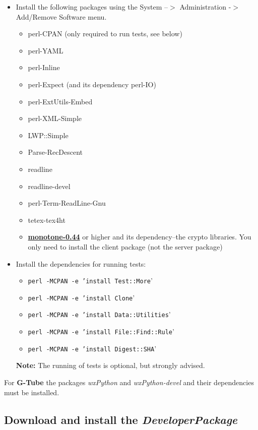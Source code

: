 \documentclass[12pt]{article}
\begin{document}
\begin{itemize}
   \item[] Install the following packages using the System --$>$ Administration -$>$ Add/Remove Software menu.
      \begin{itemize}
         \item perl-CPAN (only required to run tests, see below)
         \item perl-YAML
         \item perl-Inline
         \item perl-Expect (and its dependency perl-IO)
         \item perl-ExtUtils-Embed
         \item perl-XML-Simple
         \item LWP::Simple
         \item Parse-RecDescent
         \item readline
         \item readline-devel
         \item perl-Term-ReadLine-Gnu
         \item tetex-tex4ht
         \item \href{http://monotone.ca/}{\bf monotone-0.44} or higher and its dependency--the crypto libraries. You only need to install the client package (not the server package) 
      \end{itemize}
   \item[] Install the dependencies for running tests:
      \begin{itemize}
         \item {\tt perl -MCPAN -e 'install Test::More}'
         \item {\tt perl -MCPAN -e 'install Clone}'
         \item {\tt perl -MCPAN -e 'install Data::Utilities}'
         \item {\tt perl -MCPAN -e 'install File::Find::Rule}'
         \item {\tt perl -MCPAN -e 'install Digest::SHA}' 
      \end{itemize}
      {\bf Note:} The running of tests is optional, but strongly advised.
 \end{itemize}

 For {\bf G-Tube} the packages {\it wxPython} and
 {\it wxPython-devel} and their dependencies must be installed.
 
\subsection*{Download and install the {\it DeveloperPackage}}
\end{document}
